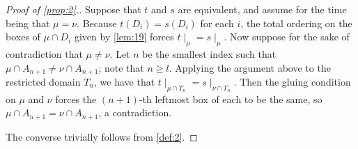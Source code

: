 \documentclass[11pt,reqno]{amsart}
\newcommand*{\restrict}[1]{{\mid}_{#1}}
\theoremstyle{definition}
\theoremstyle{problem}
\theoremstyle{plain}
\theoremstyle{remark}
\theoremstyle{theorem}
\numberwithin{equation}{section}
\numberwithin{figure}{section}
\begin{document}
\begin{proof}[Proof of \cref{prop:2}.]  
  Suppose that $t$ and $s$ are equivalent, and assume for the time
  being that $\mu = \nu$.  
  Because
  $t(D_i) = s(D_i)$ for each $i$, the total ordering on the boxes of
  $\mu \cap D_i$ given by \cref{lem:19} forces
  $t\restrict{\mu} = s\restrict{\mu}$.  Now suppose for the sake of
  contradiction that $\mu \neq \nu$.  Let $n$ be the smallest index
  such that $\mu \cap A_{n+1} \neq \nu \cap A_{n+1}$; note that
  $n \geq l$.  Applying the argument above to the restricted domain
  $T_n$, we have that
  $t\restrict{\mu \cap T_n} = s\restrict{\nu \cap T_n}$.  Then the
  gluing condition on $\mu$ and $\nu$ forces the $(n+1)$-th leftmost
  box of each to be the same, so $\mu \cap A_{n+1} = \nu \cap A_{n+1}$, a
  contradiction.

  The converse trivially follows from \cref{def:2}.
\end{proof}
\end{document}
